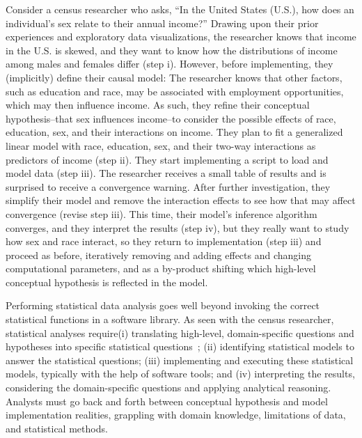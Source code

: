 Consider a census researcher who asks, ``In the United States (U.S.),
how does an individual's sex relate to their annual income?'' Drawing upon their
prior experiences and exploratory data visualizations, the researcher knows that
income in the U.S. is skewed, and they want to know how the distributions of
income among males and females differ (step i). However, before implementing,
they (implicitly) define their causal model: The researcher knows that other
factors, such as education and race, may be associated with employment
opportunities, which may then influence income. As such, they refine their
conceptual hypothesis--that sex influences income--to consider the possible
effects of race, education, sex, and their interactions on income. They plan to
fit a generalized linear model with race, education, sex, and their two-way
interactions as predictors of income (step ii). They start implementing a script
to load and model data (step iii). The researcher receives a small table of
results and is surprised to receive a convergence warning. After further
investigation, they simplify their model and remove the interaction effects to
see how that may affect convergence (revise step iii). This time, their model's
inference algorithm converges, and they interpret the results (step iv), but
they really want to study how sex and race interact, so they return to
implementation (step iii) and proceed as before, iteratively removing and adding
effects and changing computational parameters, and as a by-product shifting
which high-level conceptual hypothesis is reflected in the model.

Performing statistical data analysis goes well beyond invoking the correct
statistical functions in a software library. As seen with the census researcher,
statistical analyses require(i) translating high-level, domain-specific
questions and hypotheses into specific statistical
questions~\cite{carver2016guidelines}; (ii) identifying statistical models to
answer the statistical questions; (iii) implementing and executing these
statistical models, typically with the help of software tools; and (iv)
interpreting the results, considering the domain-specific questions and applying
analytical reasoning. Analysts must go back and forth between conceptual
hypothesis and model implementation realities, grappling with domain knowledge,
limitations of data, and statistical methods.

